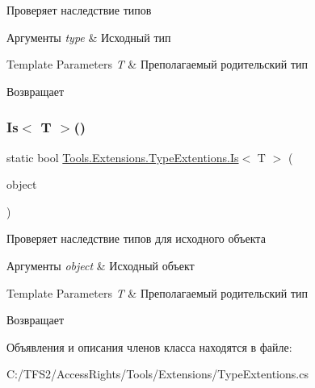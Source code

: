 Проверяет наследствие типов 


\begin{DoxyParams}{Аргументы}
{\em type} & Исходный тип\\
\hline
\end{DoxyParams}

\begin{DoxyTemplParams}{Template Parameters}
{\em T} & Преполагаемый родительский тип\\
\hline
\end{DoxyTemplParams}
\begin{DoxyReturn}{Возвращает}

\end{DoxyReturn}
\mbox{\label{class_tools_1_1_extensions_1_1_type_extentions_a7b5dcdb969ae0f6b19dedbfd4f21df64}} 
\subsubsection{\texorpdfstring{Is$<$ T $>$()}{Is< T >()}\hspace{0.1cm}{\footnotesize\ttfamily [2/2]}}
{\footnotesize\ttfamily static bool \hyperlink{class_tools_1_1_extensions_1_1_type_extentions_a017a96cb151575a7764579ca8e229361}{Tools.\+Extensions.\+Type\+Extentions.\+Is}$<$ T $>$ (\begin{DoxyParamCaption}\item[{this object @}]{object }\end{DoxyParamCaption})\hspace{0.3cm}{\ttfamily [static]}}



Проверяет наследствие типов для исходного объекта 


\begin{DoxyParams}{Аргументы}
{\em object} & Исходный объект\\
\hline
\end{DoxyParams}

\begin{DoxyTemplParams}{Template Parameters}
{\em T} & Преполагаемый родительский тип\\
\hline
\end{DoxyTemplParams}
\begin{DoxyReturn}{Возвращает}

\end{DoxyReturn}


Объявления и описания членов класса находятся в файле\+:\begin{DoxyCompactItemize}
\item 
C\+:/\+T\+F\+S2/\+Access\+Rights/\+Tools/\+Extensions/Type\+Extentions.\+cs\end{DoxyCompactItemize}
